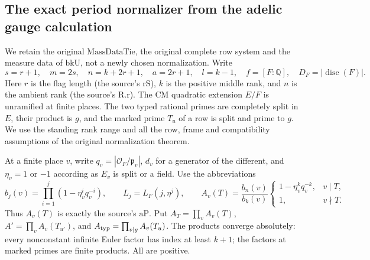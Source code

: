 \subsection{The exact period normalizer from the adelic gauge calculation}
\label{sec:flag-aa-normalization}

We retain the original \(\mathrm{MassDataTie}\), the original complete row
system and the measure data of \(\mathrm{bkU}\), not a newly chosen
normalization. Write
\[
 s=r+1,\quad m=2s,\quad n=k+2r+1,\quad a=2r+1,\quad
 l=k-1,\quad f=[F:\mathbb Q],\quad D_F=|\operatorname{disc}(F)|.
\]
Here \(r\) is the flag length (the source's \(\mathrm{rS}\)), \(k\) is
the positive middle rank, and \(n\) is the ambient rank (the source's
\(\mathrm{R.r}\)). The CM quadratic extension \(E/F\) is unramified
at finite places. The two typed rational primes are completely split
in \(E\), their product is \(g\), and the marked prime \(T_u\) of a
row is split and prime to \(g\). We use the standing rank range and
all the row, frame and compatibility assumptions of the original
normalization theorem.

At a finite place \(v\), write \(q_v=|\mathcal O_F/\mathfrak p_v|\),
\(d_v\) for a generator of the different, and \(\eta_v=1\) or \(-1\)
according as \(E_v\) is split or a field. Use the abbreviations
\[
 b_j(v)=\prod_{i=1}^j(1-\eta_v^i q_v^{-i}),\qquad
 L_j=L_F(j,\eta^j),\qquad
 A_v(T)=\frac{b_n(v)}{b_k(v)}
 \begin{cases}1-\eta_v^k q_v^{-k},&v\mid T,\\1,&v\nmid T.\end{cases}
\]
Thus \(A_v(T)\) is exactly the source's \(\mathrm{aP}\).
Put \(A_T=\prod_v A_v(T)\), \(A'=\prod_v A_v(T_{u'})\), and
\(A_{\rm typ}=\prod_{v\mid g}A_v(T_u)\). The products converge absolutely:
every nonconstant infinite Euler factor has index at least \(k+1\);
the factors at marked primes are finite products. All are positive.

